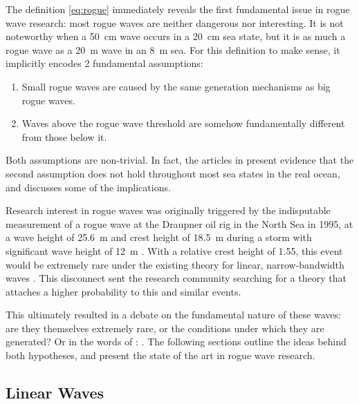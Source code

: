 The definition \eqref{eq:rogue} immediately reveals the first fundamental issue in rogue wave research: most rogue waves are neither dangerous nor interesting. It is not noteworthy when a \SI{50}{\centi\metre} wave occurs in a \SI{20}{\centi\metre} sea state, but it is as much a rogue wave as a \SI{20}{\metre} wave in an \SI{8}{\metre} sea. For this definition to make sense, it implicitly encodes 2 fundamental assumptions:

\begin{enumerate}
    \item Small rogue waves are caused by the same generation mechanisms as big rogue waves.
    \item Waves above the rogue wave threshold are somehow fundamentally different from those below it.
\end{enumerate}

Both assumptions are non-trivial. In fact, the articles in  present evidence that the second assumption does not hold throughout most sea states in the real ocean, and  discusses some of the implications.

Research interest in rogue waves was originally triggered by the indisputable measurement of a rogue wave at the Draupner oil rig in the North Sea in 1995, at a wave height of \SI{25.6}{\metre} and crest height of \SI{18.5}{\metre} during a storm with significant wave height of \SI{12}{\metre} \citep{sunde1995kjempebolger,haver2004possible}. With a relative crest height of \num{1.55}, this event would be extremely rare under the existing theory for linear, narrow-bandwidth waves \citep{longuet1952statisticaldistribution}. This disconnect sent the research community searching for a theory that attaches a higher probability to this and similar events.

This ultimately resulted in a debate on the fundamental nature of these waves: are they themselves extremely rare, or the conditions under which they are generated? Or in the words of \citeauthor{hayer2000freak}: . The following sections outline the ideas behind both hypotheses, and present the state of the art in rogue wave research.

\subsection{Linear Waves} \label{sec:waves-linear}

